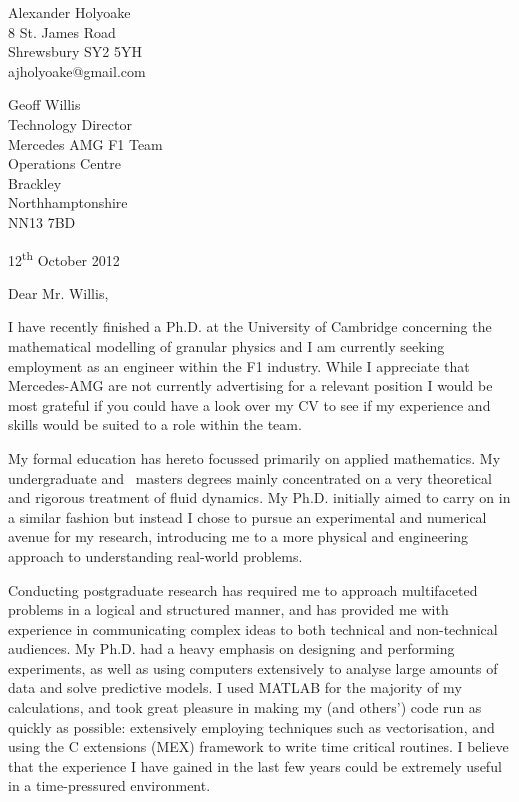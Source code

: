 \documentclass[a4paper,10pt]{article}
\begin{document}
\begin{flushright}
Alexander Holyoake \\ 8 St. James Road \\ Shrewsbury SY2 5YH \\ ajholyoake@gmail.com
\end{flushright}

\begin{flushleft} 
Geoff Willis \\ Technology Director \\ Mercedes AMG F1 Team \\ Operations Centre \\ Brackley \\ Northhamptonshire \\ NN13 7BD
\end{flushleft}

\begin{flushright}
12\textsuperscript{th} October 2012
\end{flushright}


\noindent Dear Mr. Willis, 

I have recently finished a Ph.D. at the University of Cambridge concerning the mathematical modelling of granular physics and I am currently seeking employment as an engineer within the F1 industry. While I appreciate that Mercedes-AMG are not currently advertising for a relevant position I would be most grateful if you could have a look over my CV to see if my experience and skills would be suited to a role within the team. 

My formal education has hereto focussed primarily on applied mathematics. My undergraduate and  masters degrees mainly concentrated on a very theoretical and rigorous treatment of fluid dynamics. My Ph.D. initially aimed to carry on in a similar fashion but instead I chose to pursue an experimental and numerical avenue for my research, introducing me to a more physical and engineering approach to understanding real-world problems.

Conducting postgraduate research has required me to approach multifaceted problems in a logical and structured manner, and has provided me with experience in communicating complex ideas to both technical and non-technical audiences. My Ph.D. had a heavy emphasis on designing and performing experiments, as well as using computers extensively to analyse large amounts of data and solve predictive models. I used MATLAB for the majority of my calculations, and took great pleasure in making my (and others') code run as quickly as possible: extensively employing techniques such as vectorisation, and using the C extensions (MEX) framework to write time critical routines. I believe that the experience I have gained in the last few years could be extremely useful in a time-pressured environment. 
\end{document}
